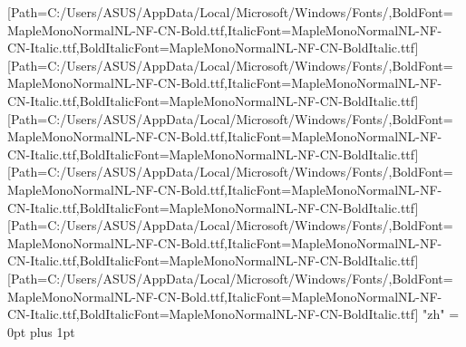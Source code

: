 \usepackage{enumitem}
\usepackage[UTF8,fontset=none]{ctex}
\usepackage{fontspec}
\usepackage{booktabs}
\usepackage{array}
\usepackage{ragged2e}
\usepackage{longtable}
\usepackage[a4paper,margin=25.4mm]{geometry}
\setlength{\arrayrulewidth}{0.5pt}
\setlength{\tabcolsep}{0pt}
\renewcommand{\arraystretch}{1.2}
\makeatletter
{}
\renewcommand\paragraph{\@startsection{paragraph}{4}{\z@}%
	{3.25ex \@plus 1ex \@minus .2ex}%
	{1.5ex \@plus .2ex}%
	{\normalfont\normalsize\bfseries}}
\renewcommand\subparagraph{\@startsection{subparagraph}{5}{\z@}%
	{3.25ex \@plus 1ex \@minus .2ex}%
	{1.5ex \@plus .2ex}%
	{\normalfont\normalsize\bfseries}}
\makeatother
{}
\setmainfont{MapleMonoNormalNL-NF-CN-Regular.ttf}[Path=C:/Users/ASUS/AppData/Local/Microsoft/Windows/Fonts/,BoldFont=MapleMonoNormalNL-NF-CN-Bold.ttf,ItalicFont=MapleMonoNormalNL-NF-CN-Italic.ttf,BoldItalicFont=MapleMonoNormalNL-NF-CN-BoldItalic.ttf]
\setsansfont{MapleMonoNormalNL-NF-CN-Regular.ttf}[Path=C:/Users/ASUS/AppData/Local/Microsoft/Windows/Fonts/,BoldFont=MapleMonoNormalNL-NF-CN-Bold.ttf,ItalicFont=MapleMonoNormalNL-NF-CN-Italic.ttf,BoldItalicFont=MapleMonoNormalNL-NF-CN-BoldItalic.ttf]
\setmonofont{MapleMonoNormalNL-NF-CN-Regular.ttf}[Path=C:/Users/ASUS/AppData/Local/Microsoft/Windows/Fonts/,BoldFont=MapleMonoNormalNL-NF-CN-Bold.ttf,ItalicFont=MapleMonoNormalNL-NF-CN-Italic.ttf,BoldItalicFont=MapleMonoNormalNL-NF-CN-BoldItalic.ttf]
[Path=C:/Users/ASUS/AppData/Local/Microsoft/Windows/Fonts/,BoldFont=MapleMonoNormalNL-NF-CN-Bold.ttf,ItalicFont=MapleMonoNormalNL-NF-CN-Italic.ttf,BoldItalicFont=MapleMonoNormalNL-NF-CN-BoldItalic.ttf]
[Path=C:/Users/ASUS/AppData/Local/Microsoft/Windows/Fonts/,BoldFont=MapleMonoNormalNL-NF-CN-Bold.ttf,ItalicFont=MapleMonoNormalNL-NF-CN-Italic.ttf,BoldItalicFont=MapleMonoNormalNL-NF-CN-BoldItalic.ttf]
[Path=C:/Users/ASUS/AppData/Local/Microsoft/Windows/Fonts/,BoldFont=MapleMonoNormalNL-NF-CN-Bold.ttf,ItalicFont=MapleMonoNormalNL-NF-CN-Italic.ttf,BoldItalicFont=MapleMonoNormalNL-NF-CN-BoldItalic.ttf]
\XeTeXlinebreaklocale "zh"
\XeTeXlinebreakskip = 0pt plus 1pt
